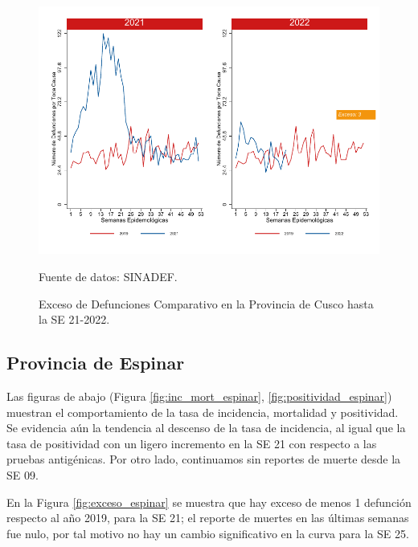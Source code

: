\documentclass[12pt,a4paper,openany]{book}
\begin{document}
	\begin{figure}[h]
		\caption{Exceso de Defunciones Comparativo en la Provincia de Cusco hasta la SE 21-2022.}\label{fig:exceso_cusco}
		\begin{center}
			\includegraphics[width=0.7\linewidth]{../figuras/exceso_7.pdf}
		\end{center}
		{\footnotesize {Fuente de datos: SINADEF.}}
	\end{figure}
	
	\clearpage
	
	\subsection*{Provincia de Espinar}
	\noindent Las figuras de abajo (Figura \ref{fig:inc_mort_espinar}, \ref{fig:positividad_espinar}) muestran el comportamiento de la tasa de incidencia, mortalidad y positividad. Se evidencia aún la tendencia al descenso de la tasa de incidencia, al igual que la tasa de positividad con un ligero incremento en la SE 21 con respecto a las pruebas antigénicas. Por otro lado, continuamos sin reportes de muerte desde la SE 09. 
	
	En la Figura \ref{fig:exceso_espinar} se muestra que hay exceso de menos 1 defunción respecto al año 2019, para la SE 21; el reporte de muertes en las últimas semanas fue nulo, por tal motivo no hay un cambio significativo en la curva para la SE 25.
	
\end{document}
